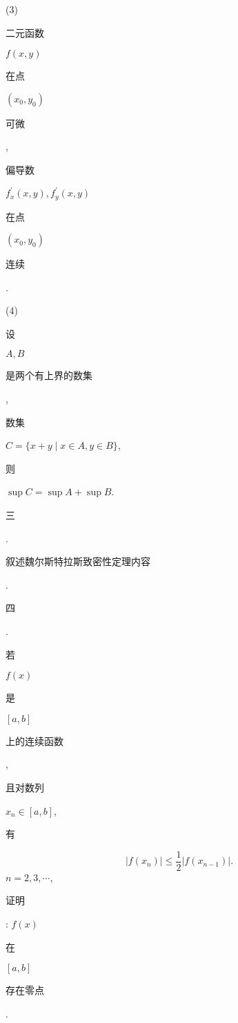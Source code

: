 \documentclass[10pt]{article}
\begin{document}
(3) \begin{CJK}{UTF8}{mj}二元函数\end{CJK} $f(x, y)$ \begin{CJK}{UTF8}{mj}在点\end{CJK} $\left(x_{0}, y_{0}\right)$ \begin{CJK}{UTF8}{mj}可微\end{CJK}, \begin{CJK}{UTF8}{mj}偏导数\end{CJK} $f_{x}^{\prime}(x, y), f_{y}^{\prime}(x, y)$ \begin{CJK}{UTF8}{mj}在点\end{CJK} $\left(x_{0}, y_{0}\right)$ \begin{CJK}{UTF8}{mj}连续\end{CJK}.

(4) \begin{CJK}{UTF8}{mj}设\end{CJK} $A, B$ \begin{CJK}{UTF8}{mj}是两个有上界的数集\end{CJK}, \begin{CJK}{UTF8}{mj}数集\end{CJK} $C=\{x+y \mid x \in A, y \in B\}$, \begin{CJK}{UTF8}{mj}则\end{CJK} $\sup C=\sup A+\sup B$.

\begin{CJK}{UTF8}{mj}三\end{CJK}. \begin{CJK}{UTF8}{mj}叙述魏尔斯特拉斯致密性定理内容\end{CJK}.

\begin{CJK}{UTF8}{mj}四\end{CJK}. \begin{CJK}{UTF8}{mj}若\end{CJK} $f(x)$ \begin{CJK}{UTF8}{mj}是\end{CJK} $[a, b]$ \begin{CJK}{UTF8}{mj}上的连续函数\end{CJK}, \begin{CJK}{UTF8}{mj}且对数列\end{CJK} $x_{n} \in[a, b]$, \begin{CJK}{UTF8}{mj}有\end{CJK}
$$
\left|f\left(x_{n}\right)\right| \leqslant \frac{1}{2}\left|f\left(x_{n-1}\right)\right| .
$$
$n=2,3, \cdots$, \begin{CJK}{UTF8}{mj}证明\end{CJK}: $f(x)$ \begin{CJK}{UTF8}{mj}在\end{CJK} $[a, b]$ \begin{CJK}{UTF8}{mj}存在零点\end{CJK}.
\end{document}
